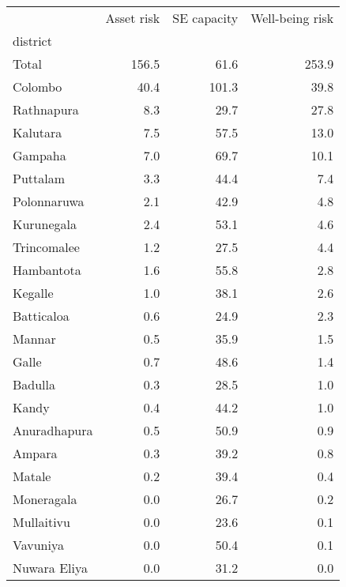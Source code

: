 \begin{tabular}{lrrr}
\toprule
{} &  Asset risk &  SE capacity &  Well-being risk \\
district     &             &              &                  \\
\midrule
Total        &       156.5 &         61.6 &            253.9 \\
Colombo      &        40.4 &        101.3 &             39.8 \\
Rathnapura   &         8.3 &         29.7 &             27.8 \\
Kalutara     &         7.5 &         57.5 &             13.0 \\
Gampaha      &         7.0 &         69.7 &             10.1 \\
Puttalam     &         3.3 &         44.4 &              7.4 \\
Polonnaruwa  &         2.1 &         42.9 &              4.8 \\
Kurunegala   &         2.4 &         53.1 &              4.6 \\
Trincomalee  &         1.2 &         27.5 &              4.4 \\
Hambantota   &         1.6 &         55.8 &              2.8 \\
Kegalle      &         1.0 &         38.1 &              2.6 \\
Batticaloa   &         0.6 &         24.9 &              2.3 \\
Mannar       &         0.5 &         35.9 &              1.5 \\
Galle        &         0.7 &         48.6 &              1.4 \\
Badulla      &         0.3 &         28.5 &              1.0 \\
Kandy        &         0.4 &         44.2 &              1.0 \\
Anuradhapura &         0.5 &         50.9 &              0.9 \\
Ampara       &         0.3 &         39.2 &              0.8 \\
Matale       &         0.2 &         39.4 &              0.4 \\
Moneragala   &         0.0 &         26.7 &              0.2 \\
Mullaitivu   &         0.0 &         23.6 &              0.1 \\
Vavuniya     &         0.0 &         50.4 &              0.1 \\
Nuwara Eliya &         0.0 &         31.2 &              0.0 \\
\bottomrule
\end{tabular}
